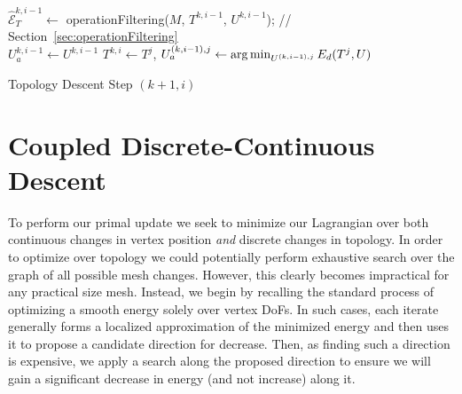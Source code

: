 
\begin{algorithm}[h]
\SetAlgoLined
{}
$\hat{\mathcal{E}}^{k,i-1}_T \leftarrow$ operationFiltering($M$, $T^{k,i-1}$, $U^{k,i-1}$); // Section~\ref{sec:operationFiltering}\\
$U_a^{k,i-1} \leftarrow U^{k,i-1}$\;
{
  $T^{k,i} \leftarrow T^j$, $U_a^{(k,i-1),j} \leftarrow \operatorname*{arg\,min}_{U^{(k,i-1),j}} E_d(T^j,U)$\;
}
\caption{Topology Descent Step $(k+1,i)$}
\label{alg:topologyStep}
\end{algorithm}

\section{Coupled Discrete-Continuous Descent}
\label{sec:topologySearch}
To perform our primal update we seek to minimize our Lagrangian
over both continuous changes in vertex position \emph{and} discrete changes in topology. 
%
In order to optimize over topology we could potentially perform exhaustive search over the graph of all possible mesh changes. However, this clearly becomes impractical for any practical size mesh. 
Instead, we begin by recalling the standard process of optimizing a smooth energy solely over vertex DoFs. In such cases, each iterate generally forms a localized approximation of the minimized energy and then uses it to propose a candidate direction for decrease. Then, as finding such a direction is expensive, we apply a search along the proposed direction to ensure we will gain a significant decrease in energy (and not increase) along it. 

